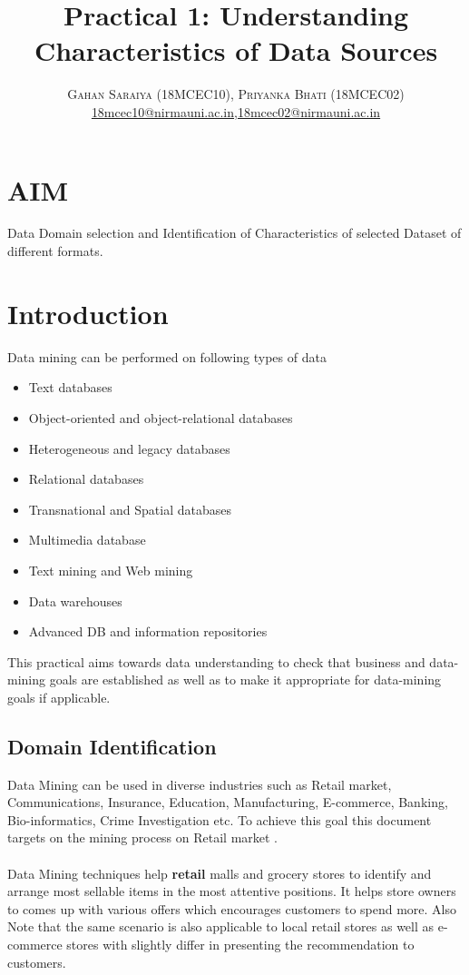 \documentclass[paper=letter, fontsize=12pt]{article}
\title{\vspace{-15mm}\fontsize{24pt}{10pt}\selectfont\textbf{Practical 1: Understanding Characteristics of Data Sources}} %
\author{
\large
{\textsc{Gahan Saraiya (18MCEC10), Priyanka Bhati (18MCEC02) }}\\[2mm]
\normalsize \href{mailto:18mcec10@nirmauni.ac.in}{18mcec10@nirmauni.ac.in},\href{mailto:18mcec02@nirmauni.ac.in}{18mcec02@nirmauni.ac.in}\\[2mm] %
}
\date{}
\begin{document}
\maketitle %
\thispagestyle{fancy} %

\section{AIM}
Data Domain selection and Identification of Characteristics of selected Dataset of different formats.

\section{Introduction}
Data mining can be performed on following types of data 
\begin{itemize}
	\item Text databases
	\item Object-oriented and object-relational databases
	\item Heterogeneous and legacy databases
	\item Relational databases
	\item Transnational and Spatial databases
	\item Multimedia database
	\item Text mining and Web mining
	\item Data warehouses
	\item Advanced DB and information repositories
	
\end{itemize}
This practical aims towards data understanding to check that business and data-mining goals are established as well as to make it appropriate for data-mining goals if applicable.

\subsection{Domain Identification}
Data Mining can be used in diverse industries such as Retail market, Communications, Insurance, Education, Manufacturing, E-commerce, Banking, Bio-informatics, Crime Investigation etc.
To achieve this goal this document  targets on the mining process on Retail market .
\paragraph{} Data Mining techniques help \textbf{retail} malls and grocery stores to identify and arrange most sellable items in the most attentive positions. It helps store owners to comes up with various offers which encourages customers to spend more. 
Also Note that the same scenario is also applicable to local retail stores as well as e-commerce stores with slightly differ in presenting the recommendation to customers.
\end{document}
